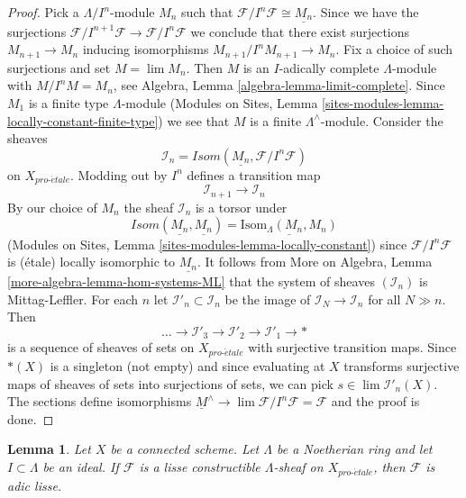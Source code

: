 \documentclass{stacks-project}
\theoremstyle{plain}
\newtheorem{lemma}[subsection]{Lemma}
\theoremstyle{definition}
\theoremstyle{remark}
\numberwithin{equation}{subsection}
\def\lim{\mathop{\mathrm{lim}}\nolimits}
\def\proetale{{pro\text{-}\acute{e}tale}}
\begin{document}
\begin{proof}
Pick a $\Lambda/I^n$-module $M_n$ such that
$\mathcal{F}/I^n\mathcal{F} \cong \underline{M_n}$.
Since we have the surjections
$\mathcal{F}/I^{n + 1}\mathcal{F} \to \mathcal{F}/I^n\mathcal{F}$
we conclude that there
exist surjections $M_{n + 1} \to M_n$ inducing isomorphisms
$M_{n + 1}/I^nM_{n + 1} \to M_n$. Fix a choice of such surjections
and set $M = \lim M_n$. Then $M$ is an $I$-adically complete
$\Lambda$-module with $M/I^nM = M_n$, see
Algebra, Lemma \ref{algebra-lemma-limit-complete}.
Since $M_1$ is a finite type $\Lambda$-module
(Modules on Sites, Lemma
\ref{sites-modules-lemma-locally-constant-finite-type})
we see that $M$ is a finite $\Lambda^\wedge$-module.
Consider the sheaves
$$
\mathcal{I}_n = \mathit{Isom}(\underline{M_n}, \mathcal{F}/I^n\mathcal{F})
$$
on $X_\proetale$. Modding out by $I^n$ defines a transition map
$$
\mathcal{I}_{n + 1} \longrightarrow \mathcal{I}_n
$$
By our choice of $M_n$ the sheaf $\mathcal{I}_n$ is a torsor under
$$
\mathit{Isom}(\underline{M_n}, \underline{M_n}) =
\underline{\text{Isom}_\Lambda(M_n, M_n)}
$$
(Modules on Sites, Lemma \ref{sites-modules-lemma-locally-constant})
since $\mathcal{F}/I^n\mathcal{F}$ is (\'etale) locally isomorphic
to $\underline{M_n}$. It follows from
More on Algebra, Lemma \ref{more-algebra-lemma-hom-systems-ML}
that the system of sheaves $(\mathcal{I}_n)$ is Mittag-Leffler.
For each $n$ let $\mathcal{I}'_n \subset \mathcal{I}_n$ be the
image of $\mathcal{I}_N \to \mathcal{I}_n$ for all $N \gg n$.
Then
$$
\ldots \to \mathcal{I}'_3 \to \mathcal{I}'_2 \to \mathcal{I}'_1 \to *
$$
is a sequence of sheaves of sets on $X_\proetale$ with surjective
transition maps. Since $*(X)$ is a singleton (not empty)
and since evaluating at $X$ transforms surjective maps of sheaves of sets
into surjections of sets, we can pick
$s \in \lim \mathcal{I}'_n(X)$. The sections define isomorphisms
$\underline{M}^\wedge \to \lim \mathcal{F}/I^n\mathcal{F} = \mathcal{F}$
and the proof is done.
\end{proof}

\begin{lemma}
\label{lemma-connected-lisse}
Let $X$ be a connected scheme. Let $\Lambda$ be a Noetherian ring and let
$I \subset \Lambda$ be an ideal. If $\mathcal{F}$ is a lisse
constructible $\Lambda$-sheaf on $X_\proetale$, then $\mathcal{F}$
is adic lisse.
\end{lemma}
\end{document}
